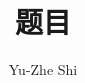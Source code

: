 \documentclass{ctexart}
\title{题目}
\author{Yu-Zhe Shi}
\begin{document}
\newtheorem{proof}{\hspace{2em}Proof}
\newtheorem{lemma}{\hspace{2em}Lemma}
\newtheorem{definition}{\hspace{2em}Definition}
\newtheorem{proposition}{\hspace{2em}Proposition}
\maketitle
\end{document}
